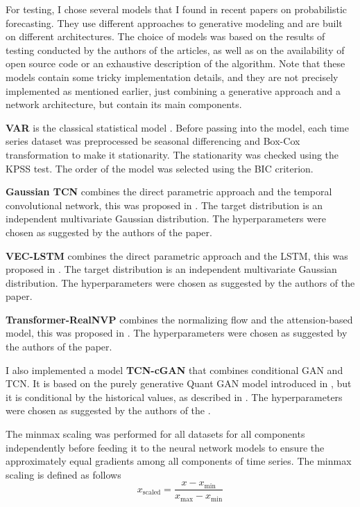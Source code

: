 \documentclass[12pt,a4paper]{article}
\begin{document}
For testing, I chose several models that I found in recent papers on probabilistic forecasting. They use different approaches to generative modeling and are built on different architectures. The choice of models was based on the results of testing conducted by the authors of the articles, as well as on the availability of open source code or an exhaustive description of the algorithm. Note that these models contain some tricky implementation details, and they are not precisely implemented as mentioned earlier, just combining a generative approach and a network architecture, but contain its main components.

\textbf{VAR} is the classical statistical model \cite{fpp3}. Before passing into the model, each time series dataset was preprocessed be seasonal differencing and Box-Cox transformation to make it stationarity. The stationarity was checked using the KPSS test. The order of the model was selected using the BIC criterion.

\textbf{Gaussian TCN} combines the direct parametric approach and the temporal convolutional network, this was proposed in \cite{gaussiantcn2020}. The target distribution is an independent multivariate Gaussian distribution. The hyperparameters were chosen as suggested by the authors of the paper.

\textbf{VEC-LSTM} combines the direct parametric approach and the LSTM, this was proposed in \cite{Salinas2019HighDimensionalMF}. The target distribution is an independent multivariate Gaussian distribution. The hyperparameters were chosen as suggested by the authors of the paper.

\textbf{Transformer-RealNVP} combines the normalizing flow and the attension-based model, this was proposed in \cite{normflow2021}. The hyperparameters were chosen as suggested by the authors of the paper.

I also implemented a model \textbf{TCN-cGAN} that combines conditional GAN and TCN. It is based on the purely generative Quant GAN model introduced in \cite{quantgan2020}, but it is conditional by the historical values, as described in \cite{koochali2020like}. The hyperparameters were chosen as suggested by the authors of the \cite{quantgan2020}.

The minmax scaling was performed for all datasets for all components independently before feeding it to the neural network models to ensure the approximately equal gradients among all components of time series. The minmax scaling is defined as follows
$$x_\text{scaled} = \frac{x-x_{\min}}{x_{\max} - x_{\min}}$$
\end{document}
